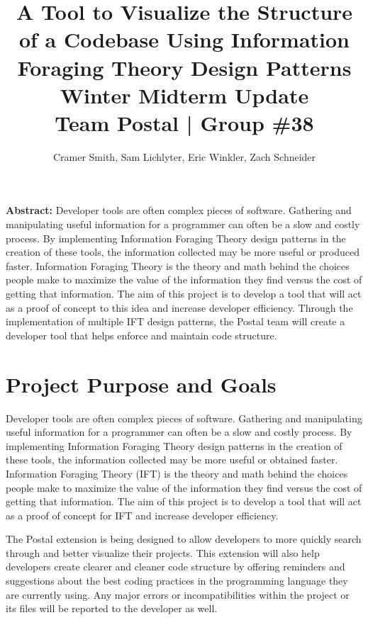 \documentclass[letterpaper,10pt,titlepage,draftclsnofoot,onecolumn,onesided] {IEEEtran}
\def\doctitle{A Tool to Visualize the Structure of a Codebase Using Information Foraging Theory Design Patterns}
\def\doctype{Progress Report}
\def\doctype{Winter Midterm Update}
\def\team{Team Postal | Group \#38}
\begin{document}
\title{\Huge{\bfseries{\textsf{\doctitle}}}\\\textsf{\Large{\doctype}}\\\textsf{\large{\team}}}
\author{Cramer Smith, Sam Lichlyter, Eric Winkler, Zach Schneider}

\maketitle
\vfill

\setlength\parindent{0pt} \textbf{Abstract:} Developer tools are often complex pieces of software. 
Gathering and manipulating useful information for a programmer can often be a slow and costly process. 
By implementing Information Foraging Theory design patterns in the creation of these tools, the information collected may be more useful or produced faster. 
Information Foraging Theory is the theory and math behind the choices people make to maximize the value of the information they find versus the cost of getting that information.
The aim of this project is to develop a tool that will act as a proof of concept to this idea and increase developer efficiency.
Through the implementation of multiple IFT design patterns, the Postal team will create a developer tool that helps enforce and maintain code structure. 

\vfill

\pagebreak

\tableofcontents


\pagebreak

\section{Project Purpose and Goals}
Developer tools are often complex pieces of software. 
Gathering and manipulating useful information for a programmer can often be a slow and costly process. 
By implementing Information Foraging Theory design patterns in the creation of these tools, the information collected may be more useful or obtained faster. 
Information Foraging Theory (IFT) is the theory and math behind the choices people make to maximize the value of the information they find versus the cost of getting that information.
The aim of this project is to develop a tool that will act as a proof of concept for IFT and increase developer efficiency.

The Postal extension is being designed to allow developers to more quickly search through and better visualize their projects.
This extension will also help developers create clearer and cleaner code structure by offering reminders and suggestions about the best coding practices in the programming language they are currently using.
Any major errors or incompatibilities within the project or its files will be reported to the developer as well.
\end{document}
